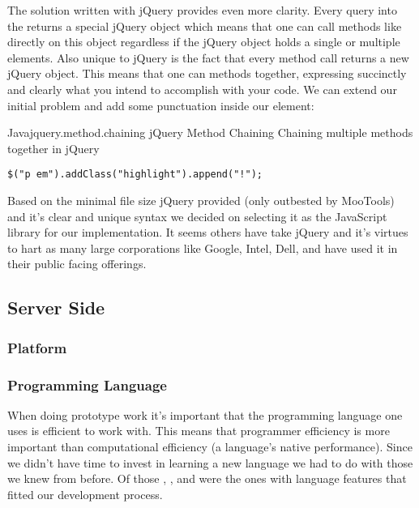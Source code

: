The solution written with jQuery provides even more clarity.
Every query into the  returns a special jQuery object which means
that one can call methods like  directly on this object
regardless if the jQuery object holds a single or multiple elements.
Also unique to jQuery is the fact that every method call returns a new jQuery
object. This means that one can  methods together, expressing
succinctly and clearly what you intend to accomplish with your code. We can
extend our initial problem and add some punctuation inside our 
element:

\begin{scode}{Java}{jquery.method.chaining}{%
  jQuery Method Chaining}{%
  Chaining multiple methods together in jQuery}
\begin{lstlisting}
$("p em").addClass("highlight").append("!");
\end{lstlisting}
\end{scode}

Based on the minimal file size jQuery provided (only outbested by MooTools)
and it's clear and unique syntax we decided on selecting it as the JavaScript
library for our implementation. It seems others have take jQuery and it's
virtues to hart as many large corporations like Google, Intel, Dell, and
 have used it in their public facing offerings.%

\subsection{Server Side}

\subsubsection{Platform}

\subsubsection{Programming Language}

When doing prototype work it's important that the programming language one
uses is efficient to work with. This means that programmer efficiency is more
important than computational efficiency (a language's native performance).
Since we didn't have time to invest in learning a new language we had to do
with those we knew from before. Of those %
,
%
, and
%
were the ones with language features that fitted our development process.

